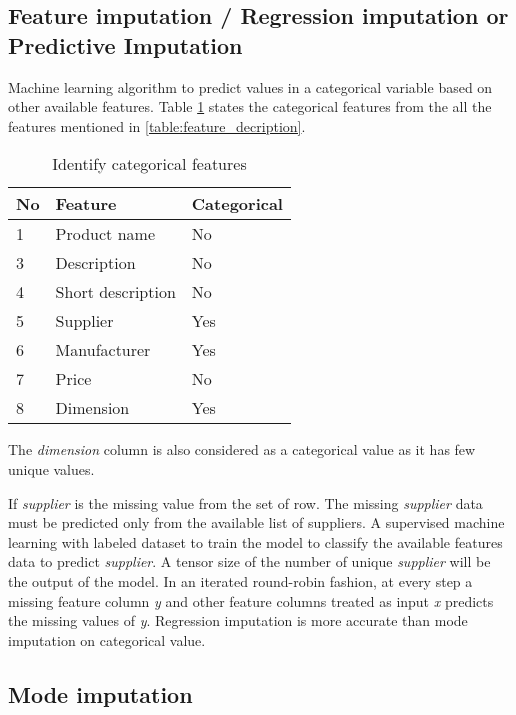 \subsection{Feature imputation / Regression imputation or \\ Predictive Imputation}

Machine learning algorithm to predict values in a categorical variable based on other available features. Table \ref{table:feature_imputation} states the categorical features from the all the features mentioned in \ref{table:feature_decription}.


\begin{table}[h]
    \centering
    \caption{Identify categorical features}
    \label{table:feature_imputation}
    \begin{tabular}{ lll }
          \toprule
          
          \textbf{No}& \textbf{Feature} & \textbf{Categorical}\\
          \midrule
          1&Product name & No\\
          3&Description & No\\         
          4&Short description  & No\\
          5&Supplier  & Yes\\
          6&Manufacturer  &  Yes\\           
          7&Price  &  No \\
          8&Dimension  & Yes\\
          \bottomrule
          \end{tabular}
\end{table}

The \textit{dimension} column is also considered as a categorical value as it has few unique values.

If \textit{supplier} is the missing value from the set of row. The missing \textit{supplier} data must be predicted only from the available list of suppliers. A supervised machine learning with labeled dataset to train the model to classify the available features data to predict \textit{supplier}. A tensor size of the number of unique \textit{supplier} will be the output of the model. 
In an iterated round-robin fashion, at every step a missing feature column  \textit{y} and other feature columns treated as input \textit{x} predicts the missing values of \textit{y}. Regression imputation is more accurate than mode imputation on categorical value.


\subsection{Mode imputation}

